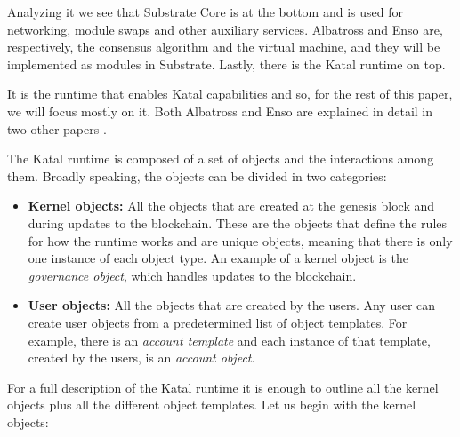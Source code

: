 \documentclass[conference]{IEEEtran}
\begin{document}
Analyzing it we see that Substrate Core is at the bottom and is used for networking, module swaps and other auxiliary services. Albatross and Enso are, respectively, the consensus algorithm and the virtual machine, and they will be implemented as modules in Substrate. Lastly, there is the Katal runtime on top.

It is the runtime that enables Katal capabilities and so, for the rest of this paper, we will focus mostly on it. Both Albatross and Enso are explained in detail in two other papers \cite{franca2019albatross} \cite{franca2019enso}.

The Katal runtime is composed of a set of objects and the interactions among them. Broadly speaking, the objects can be divided in two categories:

\begin{itemize}
	\item \textbf{Kernel objects:} All the objects that are created at the genesis block and during updates to the blockchain. These are the objects that define the rules for how the runtime works and are unique objects, meaning that there is only one instance of each object type. An example of a kernel object is the \textit{governance object}, which handles updates to the blockchain.
	\item \textbf{User objects:} All the objects that are created by the users. Any user can create user objects from a predetermined list of object templates. For example, there is an \textit{account template} and each instance of that template, created by the users, is an \textit{account object}.
\end{itemize}

For a full description of the Katal runtime it is enough to outline all the kernel objects plus all the different object templates. Let us begin with the kernel objects:
\end{document}
